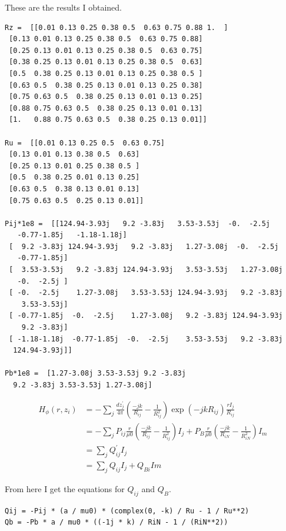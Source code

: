 \documentclass[11pt, a4paper]{article}
\begin{document}
These are the results I obtained.
\begin{verbatim}
Rz =  [[0.01 0.13 0.25 0.38 0.5  0.63 0.75 0.88 1.  ]
 [0.13 0.01 0.13 0.25 0.38 0.5  0.63 0.75 0.88]
 [0.25 0.13 0.01 0.13 0.25 0.38 0.5  0.63 0.75]
 [0.38 0.25 0.13 0.01 0.13 0.25 0.38 0.5  0.63]
 [0.5  0.38 0.25 0.13 0.01 0.13 0.25 0.38 0.5 ]
 [0.63 0.5  0.38 0.25 0.13 0.01 0.13 0.25 0.38]
 [0.75 0.63 0.5  0.38 0.25 0.13 0.01 0.13 0.25]
 [0.88 0.75 0.63 0.5  0.38 0.25 0.13 0.01 0.13]
 [1.   0.88 0.75 0.63 0.5  0.38 0.25 0.13 0.01]]
 
Ru =  [[0.01 0.13 0.25 0.5  0.63 0.75]
 [0.13 0.01 0.13 0.38 0.5  0.63]
 [0.25 0.13 0.01 0.25 0.38 0.5 ]
 [0.5  0.38 0.25 0.01 0.13 0.25]
 [0.63 0.5  0.38 0.13 0.01 0.13]
 [0.75 0.63 0.5  0.25 0.13 0.01]]
 
Pij*1e8 =  [[124.94-3.93j   9.2 -3.83j   3.53-3.53j  -0.  -2.5j
   -0.77-1.85j   -1.18-1.18j]
 [  9.2 -3.83j 124.94-3.93j   9.2 -3.83j   1.27-3.08j  -0.  -2.5j
   -0.77-1.85j]
 [  3.53-3.53j   9.2 -3.83j 124.94-3.93j   3.53-3.53j   1.27-3.08j
   -0.  -2.5j ]
 [ -0.  -2.5j    1.27-3.08j   3.53-3.53j 124.94-3.93j   9.2 -3.83j
    3.53-3.53j]
 [ -0.77-1.85j  -0.  -2.5j    1.27-3.08j   9.2 -3.83j 124.94-3.93j
    9.2 -3.83j]
 [ -1.18-1.18j  -0.77-1.85j  -0.  -2.5j    3.53-3.53j   9.2 -3.83j
  124.94-3.93j]]
  
Pb*1e8 =  [1.27-3.08j 3.53-3.53j 9.2 -3.83j
  9.2 -3.83j 3.53-3.53j 1.27-3.08j]
\end{verbatim}
\begin{align*}
    H_\phi(r, z_i) & = -\sum_{j} \frac{dz^{'}_j}{4\pi}(\frac{-jk}{R_{ij}}-\frac{1}{R^2_{ij}})\exp(-jkR_{ij})\frac{rI_j}{R_{ij}}                                \\
                   & = -\sum_{j}P_{ij}\frac{r}{\mu0}(\frac{-jk}{R_{ij}}-\frac{1}{R^2_{ij}})I_j + P_{B}\frac{r}{\mu0}(\frac{-jk}{R_{iN}}-\frac{1}{R^2_{iN}})I_m \\
                   & = \sum_{j}Q^{'}_{ij}I_j                                                                                                                   \\
                   & = \sum_{j}Q_{ij}I_{j} + Q_{Bi}Im
\end{align*}

From here I get the equations for $Q_{ij}$ and $Q_B$.

\begin{verbatim}
Qij = -Pij * (a / mu0) * (complex(0, -k) / Ru - 1 / Ru**2)
Qb = -Pb * a / mu0 * ((-1j * k) / RiN - 1 / (RiN**2))

\end{verbatim}
\end{document}
